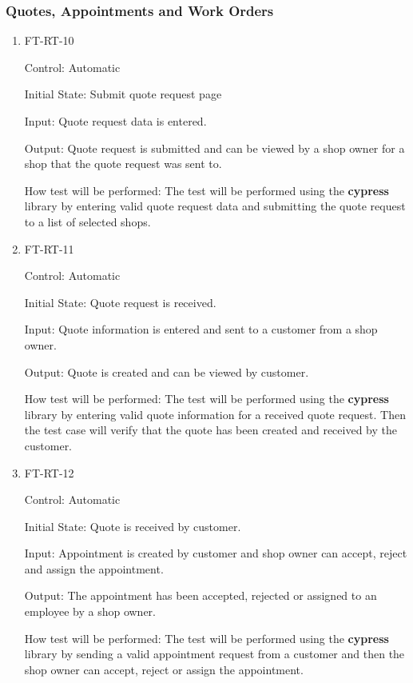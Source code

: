 \documentclass[12pt, titlepage]{article}
\begin{document}
\subsubsection{Quotes, Appointments and Work Orders}
\begin{enumerate}

\item{FT-RT-10\\}

Control: Automatic
					
Initial State: Submit quote request page
					
Input: Quote request data is entered.
					
Output: Quote request is submitted and can be viewed by a shop owner for a shop that the quote request was sent to.

How test will be performed: The test will be performed using the \textbf{cypress} library by entering valid quote request data and submitting the quote request to a list of selected shops.

\item{FT-RT-11\\}

Control: Automatic
					
Initial State: Quote request is received.
					
Input: Quote information is entered and sent to a customer from a shop owner.
					
Output: Quote is created and can be viewed by customer.

How test will be performed: The test will be performed using the \textbf{cypress} library by entering valid quote information for a received quote request. Then the test case will verify that the quote has been created and received by the customer.

\item{FT-RT-12\\}

Control: Automatic
					
Initial State: Quote is received by customer.
					
Input: Appointment is created by customer and shop owner can accept, reject and assign the appointment.
					
Output: The appointment has been accepted, rejected or assigned to an employee by a shop owner.

How test will be performed: The test will be performed using the \textbf{cypress} library by sending a valid appointment request from a customer and then the shop owner can accept, reject or assign the appointment.


\end{enumerate}
\end{document}
